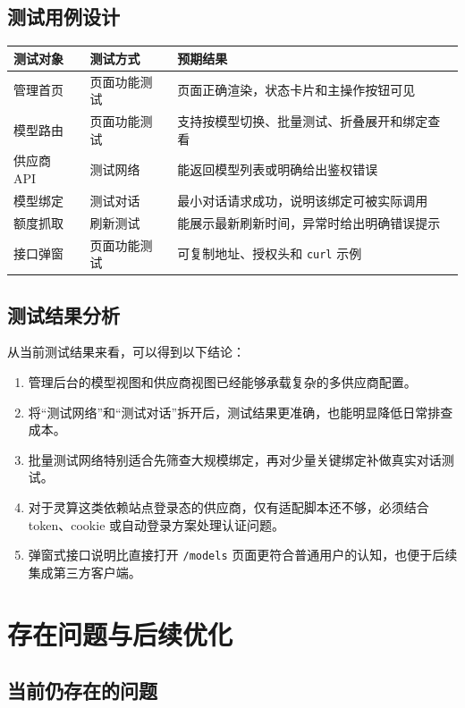 \documentclass[12pt,a4paper]{ctexart}
\begin{document}
\subsection{测试用例设计}

\begin{longtable}{p{3cm}p{4.2cm}p{5.8cm}}
\toprule
测试对象 & 测试方式 & 预期结果 \\
\midrule
\endhead
管理首页 & 页面功能测试 & 页面正确渲染，状态卡片和主操作按钮可见 \\
模型路由 & 页面功能测试 & 支持按模型切换、批量测试、折叠展开和绑定查看 \\
供应商 API & 测试网络 & 能返回模型列表或明确给出鉴权错误 \\
模型绑定 & 测试对话 & 最小对话请求成功，说明该绑定可被实际调用 \\
额度抓取 & 刷新测试 & 能展示最新刷新时间，异常时给出明确错误提示 \\
接口弹窗 & 页面功能测试 & 可复制地址、授权头和 \texttt{curl} 示例 \\
\bottomrule
\end{longtable}

\subsection{测试结果分析}

从当前测试结果来看，可以得到以下结论：

\begin{enumerate}[label=\arabic*.]
  \item 管理后台的模型视图和供应商视图已经能够承载复杂的多供应商配置。
  \item 将“测试网络”和“测试对话”拆开后，测试结果更准确，也能明显降低日常排查成本。
  \item 批量测试网络特别适合先筛查大规模绑定，再对少量关键绑定补做真实对话测试。
  \item 对于灵算这类依赖站点登录态的供应商，仅有适配脚本还不够，必须结合 token、cookie 或自动登录方案处理认证问题。
  \item 弹窗式接口说明比直接打开 \texttt{/models} 页面更符合普通用户的认知，也便于后续集成第三方客户端。
\end{enumerate}

\section{存在问题与后续优化}

\subsection{当前仍存在的问题}
\end{document}
